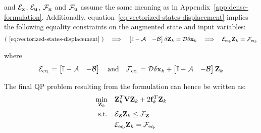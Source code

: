 \documentclass[../main.tex]{subfiles}
\begin{document}
and $\mathcal{E}_{\mathbf{x}}$, $\mathcal{E}_{\mathbf{u}}$, $\mathcal{F}_{\mathbf{x}}$ and
$\mathcal{F}_{\mathbf{u}}$
assume the same meaning as in Appendix~\ref{app:dense-formulation}.
Additionally, equation~\ref{eq:vectorized-states-displacement} implies the
following equality constraints on the augmented state and input variables:
\begin{equation*}
	(~\ref{eq:vectorized-states-displacement}~) 
	\quad \Longrightarrow \quad
	\begin{bmatrix}
		\mathbb{I} - \mathcal{A} & -\mathcal{B}
	\end{bmatrix}
	\delta \mathbf{Z}_k = \mathcal{D} \delta \mathbf{x}_k
	\quad \Longrightarrow \quad
	\mathcal{E}_{\text{eq.}} \mathbf{Z}_k = \mathcal{F}_{\text{eq.}}
\end{equation*}

where
\begin{equation*}
	\mathcal{E}_{\text{eq.}} = \begin{bmatrix}
		\mathbb{I} - \mathcal{A} & -\mathcal{B}
	\end{bmatrix}
	\quad \text{and} \quad
	\mathcal{F}_{\text{eq.}} = \mathcal{D} \delta \mathbf{x}_k + \begin{bmatrix}
		\mathbb{I} - \mathcal{A} & -\mathcal{B}
\end{bmatrix} \bar{\mathbf{Z}}_k
\end{equation*}

The final QP problem resulting from the  formulation can hence be
written as:
\begin{equation}
	\begin{aligned}
		\min_{\mathbf{Z}_k} \quad & \mathbf{Z}_k^T \mathbf{V} \mathbf{Z}_k + 2 \mathbf{f}_k^T
		\mathbf{Z}_k\\
		\text{s.t.} \quad & \mathcal{E}_{\mathbf{Z}} \mathbf{Z}_k \leq \mathcal{F}_{\mathbf{Z}}\\
		& \mathcal{E}_{\text{eq.}} \mathbf{Z}_k = \mathcal{F}_{\text{eq.}}
	\end{aligned}
\end{equation}
\end{document}
